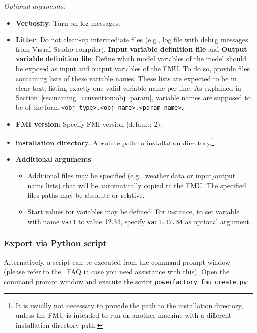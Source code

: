 \textit{Optional arguments}:
\begin{itemize}
   \item \textbf{Verbosity}: Turn on log messages.
   \item \textbf{Litter}: Do not clean-up intermediate files (e.g., log file with debug messages from Visual Studio compiler).
   \ietm \textbf{Input variable definition file} and \textbf{Output variable definition file}:
   Define which model variables of the \pf model should be exposed as input and output variables of the FMU.
   To do so, provide files containing lists of these variable names.
   These lists are expected to be in clear text, listing exactly one valid variable name per line.
   As explained in Section~\ref{sec:naming_convention:obj_param}, variable names are supposed to be of the  form \texttt{<obj-type>.<obj-name>.<param-name>}.
   \item \textbf{FMI version}: Specify FMI version (default: 2).
   \item \textbf{\pf installation directory}: Absolute path to \pf installation directory.\footnote{It is usually not necessary to provide the path to the \pf installation directory, unless the FMU is intended to run on another machine with a different installation directory path.}
   \item \textbf{Additional arguments}:
   \begin{itemize}
      \item Additional files may be specified (e.g., weather data or input/output name lists) that will be automatically copied to the FMU. The specified files paths may be absolute or relative.
      \item Start values for variables may be defined. For instance, to set variable with name \verb!var1! to value 12.34, specify \verb!var1=12.34! as optional argument.
   \end{itemize}
\end{itemize}


\subsubsection*{Export via Python script}

Alternatively, a \python script can be executed from the command prompt window (please refer to the \href{https://docs.python.org/3/faq/windows.html}{\python~FAQ} in case you need assistance with this).
Open the command prompt window and execute the script \texttt{powerfactory\_fmu\_create.py}:


